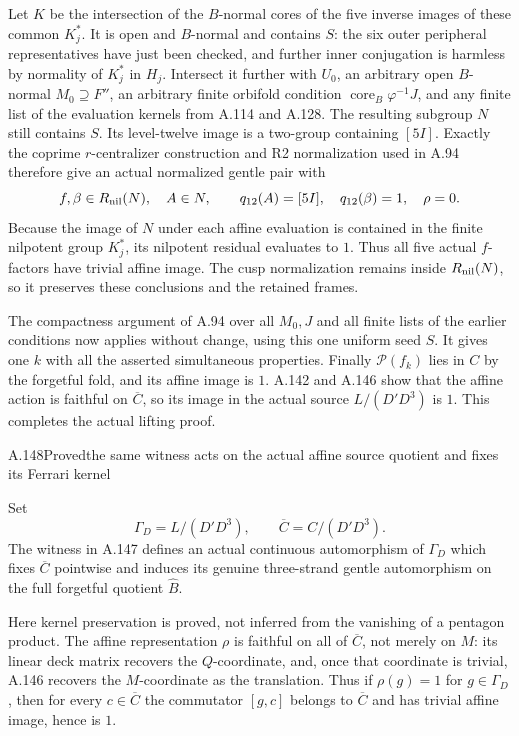 Let $K$ be the intersection of the $B$-normal cores of
the five inverse images of these common $K_j^*$.
It is open and $B$-normal and contains $S$: the six
outer peripheral representatives have just been checked,
and further inner conjugation is harmless by normality
of $K_j^*$ in $H_j$.  Intersect it further with
$U_0$, an arbitrary open $B$-normal $M_0\supseteq F''$,
an arbitrary finite orbifold condition
$\operatorname{core}_B\varphi^{-1}J$, and any finite list
of the evaluation kernels from A.114 and A.128.  The
resulting subgroup $N$ still contains $S$.  Its
level-twelve image is a two-group containing $[5I]$.
Exactly the coprime $r$-centralizer construction and R2
normalization used in A.94 therefore give an actual
normalized gentle pair with
\[
 f,\beta\in R_{\rm nil}(N),\quad A\in N,
 \qquad q_{12}(A)=[5I],\quad q_{12}(\beta)=1,
 \quad\rho=0.
\]
Because the image of $N$ under each affine evaluation
is contained in the finite nilpotent group $K_j^*$, its
nilpotent residual evaluates to $1$.  Thus all five
actual $f$-factors have trivial affine image.  The cusp
normalization remains inside $R_{\rm nil}(N)$, so it
preserves these conclusions and the retained frames.

The compactness argument of A.94 over all $M_0,J$ and
all finite lists of the earlier conditions now applies
without change, using this one uniform seed $S$.
It gives one $k$ with all the asserted simultaneous
properties.  Finally $\mathcal P(f_k)$ lies in $C$ by
the forgetful fold, and its affine image is $1$.
A.142 and A.146 show that the affine action is faithful on
$\overline C$, so its image in the actual source
$L/(D'D^3)$ is $1$.
This completes the actual lifting proof.

\begin{statement}{A.148}{Proved}{the same witness acts on the actual affine source quotient and fixes its Ferrari kernel}
\end{statement}
Set
\[
 \Gamma_D=L/(D'D^3),
 \qquad \overline C=C/(D'D^3).
\]
The witness in A.147 defines an actual continuous automorphism
of $\Gamma_D$ which fixes $\overline C$ pointwise and induces
its genuine three-strand gentle automorphism on the full
forgetful quotient $\widehat B$.

Here kernel preservation is proved, not inferred from the
vanishing of a pentagon product.  The affine representation
$\rho$ is faithful on all of $\overline C$, not merely on
$M$: its linear deck matrix recovers the $Q$-coordinate,
and, once that coordinate is trivial, A.146 recovers the
$M$-coordinate as the translation.  Thus if $\rho(g)=1$
for $g\in\Gamma_D$, then for every $c\in\overline C$
the commutator $[g,c]$ belongs to $\overline C$ and has
trivial affine image, hence is $1$.

